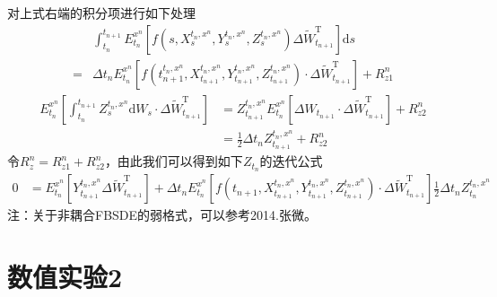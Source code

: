 		对上式右端的积分项进行如下处理
		\begin{align*}
		&\int_{{t_n}}^{{t_{n + 1}}} E_{{t_n}}^{{x^n}}\left[ f\left( {s,X_s^{{t_n},{x^n}},Y_s^{{t_n},{x^n}},Z_s^{{t_n},{x^n}}} \right)\Delta \tilde W_{{t_{n + 1}}}^\mathrm{T} \right] \mathrm{d}s \\
		={}&\Delta {t_n}E_{{t_n}}^{{x^n}}\left[ f\left( t_{n + 1}^{{t_n},{x^n}},X_{{t_{n + 1}}}^{{t_n},{x^n}},Y_{{t_{n + 1}}}^{{t_n},{x^n}},Z_{{t_{n + 1}}}^{{t_n},{x^n}} \right) \cdot \Delta \tilde W_{{t_{n + 1}}}^\mathrm{T} \right] + R_{z1}^n
		\end{align*}
				\begin{equation*}
					\begin{split}
				E_{{t_n}}^{{x^n}}\left[ {\int_{{t_n}}^{{t_{n + 1}}} {Z_s^{{t_n},{x^n}}\mathrm{d}{W_s} \cdot \Delta \tilde W_{{t_{n + 1}}}^\mathrm{T}} } \right] &= Z_{{t_{n + 1}}}^{{t_n},{x^n}}E_{{t_n}}^{{x^n}}\left[ {\Delta {W_{{t_{n + 1}}}} \cdot \Delta \tilde W_{{t_{n + 1}}}^\mathrm{T}} \right] + R_{z2}^n \\
				&= \frac{1}{2}\Delta {t_n}Z_{{t_{n + 1}}}^{{t_n},{x^n}} + R_{z2}^n
					\end{split}
				\end{equation*}
		令$R_z^n=R_{z1}^n+R_{z2}^n$，由此我们可以得到如下$Z_{t_n}$的迭代公式
				\begin{equation*}
					\begin{split}
					0 &= E_{{t_n}}^{{x^n}}\left[ {Y_{{t_{n + 1}}}^{{t_n},{x^n}}\Delta \tilde W_{{t_{n + 1}}}^\mathrm{T}} \right] + \Delta {t_n}E_{{t_n}}^{{x^n}}\left[ {f\left( {{t_{n + 1}},X_{{t_{n + 1}}}^{{t_n},{x^n}},Y_{{t_{n + 1}}}^{{t_n},{x^n}},Z_{{t_{n + 1}}}^{{t_n},{x^n}}} \right) \cdot \Delta \tilde W_{{t_{n + 1}}}^\mathrm{T}} \right] \frac{1}{2}\Delta {t_n}Z_{{t_n}}^{{t_n},{x^n}}
				\end{split}
				\end{equation*}
		注：关于非耦合FBSDE的弱格式，可以参考2014.张微\cite{Zhang.2014}。

\section{数值实验2}

